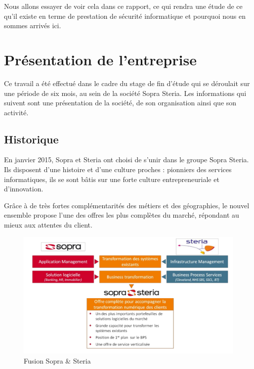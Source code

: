 \documentclass[a4paper]{memoir}
\begin{document}
Nous allons essayer de voir cela dans ce rapport, ce qui rendra une étude de ce qu'il existe en terme de prestation de sécurité informatique et pourquoi nous en sommes arrivés ici.



\chapter*{Présentation de l'entreprise}

Ce travail a été effectué dans le cadre du stage de fin d'étude qui se déroulait sur une période de six mois, au sein de la société Sopra Steria.
Les informations qui suivent sont une présentation de la société, de son organisation ainsi que son activité.

\section*{Historique}

En janvier 2015, Sopra et Steria ont choisi de s’unir dans le groupe Sopra Steria. Ils disposent d’une histoire et d’une culture proches : pionniers des services informatiques, ils se sont bâtis sur une forte culture entrepreneuriale et d’innovation.

Grâce à de très fortes complémentarités des métiers et des géographies, le nouvel ensemble propose l’une des offres les plus complètes du marché, répondant au mieux aux attentes du client. 

\begin{figure}[!ht]
    \center
    \includegraphics[width=1\textwidth]{./images/sopra1.png}
    \caption{Fusion Sopra \& Steria}
    \label{Sopra+Steria}
\end{figure}
\end{document}
